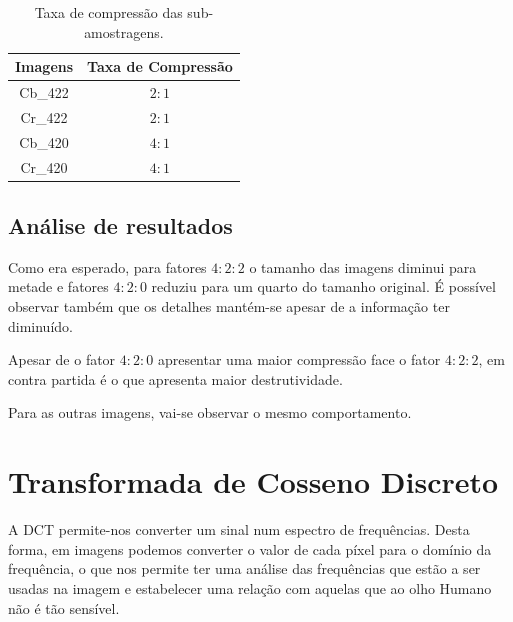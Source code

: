 \documentclass[a4paper, 12pt]{article}
\begin{document}
        \begin{table}[H]
            \centering
            \addtolength\tabcolsep{20pt}
            \begin{tabular}{||c | c ||} 
                \hline
                Imagens           & Taxa de Compressão \\
                \hline\hline
                Cb\_422 & $2 : 1$ \\
                Cr\_422 & $2  : 1$  \\
                Cb\_420 & $4  : 1$  \\
                Cr\_420 & $4  : 1$  \\ 
                \hline
            \end{tabular}
            \caption{\label{demo-table} Taxa de compressão das sub-amostragens.}
        \end{table}
        
    \subsection{Análise de resultados}
        Como era esperado, para fatores $4:2:2$ o tamanho das imagens diminui para metade e fatores $4:2:0$
        reduziu para um quarto do tamanho original.
        É possível observar também que os detalhes mantém-se apesar de a informação ter diminuído.

        Apesar de o fator $4:2:0$ apresentar uma maior compressão face o fator $4:2:2$, em contra partida
        é o que apresenta maior destrutividade.

        Para as outras imagens, vai-se observar o mesmo comportamento.

        

\pagebreak        
\section{Transformada de Cosseno Discreto}
    A DCT permite-nos converter um sinal num espectro de frequências. Desta forma, em imagens podemos
    converter o valor de cada píxel para o domínio da frequência, o que nos permite ter uma análise das
    frequências que estão a ser usadas na imagem e estabelecer uma relação com aquelas que ao olho Humano
    não é tão sensível.
\end{document}
